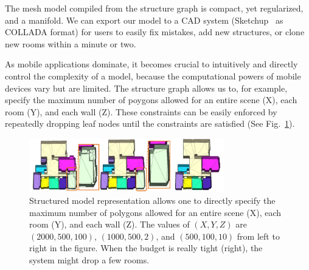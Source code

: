  The mesh model compiled from the structure
graph is compact, yet regularized, and a manifold. We can export our
model to a CAD system (\eg Sketchup~\cite{sketchup} as COLLADA format)
for users to easily fix mistakes, add new structures, or clone new rooms
within a minute or two.

 As mobile applications
dominate, it becomes crucial to intuitively and directly control the
complexity of a model, because the computational powers of mobile
devices vary but are limited.
The structure graph allows us to,
for example, specify the maximum number of poygons allowed for an entire
scene (X), each room (Y), and each wall (Z). These constraints can be
easily enforced by repeatedly dropping leaf nodes until the constraints
are satisfied
(See Fig.~\ref{fig:complexity_control}).
\begin{figure}[!t]
\begin{center}
\includegraphics[width=85mm]{../figures/complexity2.pdf}
\end{center}
 \vspace{-0.2cm}
\caption{Structured model representation allows one to
 directly specify the
 maximum number of polygons allowed for an entire scene (X), each room
 (Y), and each wall (Z). The values of $(X,Y,Z)$ are $(2000,500,100)$,
 $(1000, 500, 2)$, and $(500, 100, 10)$ from left to right in the figure.
 When the budget is really tight (right), the
 system might drop a few rooms. %
 }
\label{fig:complexity_control}
 \vspace{-0.25cm}
\end{figure}


